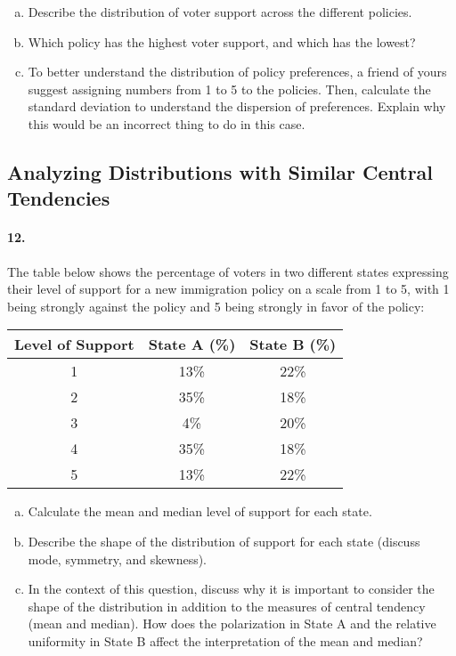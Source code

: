 \documentclass{article}
\begin{document}
\begin{enumerate}[a)]
    \item Describe the distribution of voter support across the different policies. 
    \item Which policy has the highest voter support, and which has the lowest?
    \item To better understand the distribution of policy preferences, a friend of yours suggest assigning numbers from 1 to 5 to the policies. Then, calculate the standard deviation to understand the dispersion of preferences. Explain why this would be an incorrect thing to do in this case.
\end{enumerate}

\subsection*{Analyzing Distributions with Similar Central Tendencies}
\paragraph{12.} The table below shows the percentage of voters in two different states expressing their level of support for a new immigration policy on a scale from 1 to 5, with 1 being strongly against the policy and 5 being strongly in favor of the policy:

\begin{center}
    \begin{tabular}{|c|c|c|}
    \hline
    Level of Support & State A (\%) & State B (\%) \\
    \hline
    1 & 13\% & 22\% \\
    2 & 35\% & 18\% \\
    3 & 4\% & 20\% \\
    4 & 35\% & 18\% \\
    5 & 13\% & 22\% \\
    \hline
    \end{tabular}
\end{center}

\begin{enumerate}[a)]
    \item Calculate the mean and median level of support for each state.
    \item Describe the shape of the distribution of support for each state (discuss mode, symmetry, and skewness).
    \item In the context of this question, discuss why it is important to consider the shape of the distribution in addition to the measures of central tendency (mean and median). How does the polarization in State A and the relative uniformity in State B affect the interpretation of the mean and median?
\end{enumerate}
\end{document}
